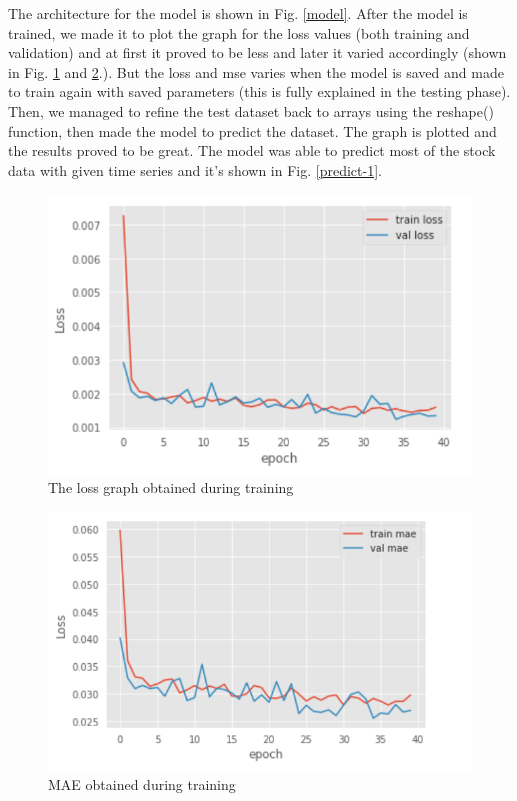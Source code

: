 \documentclass[conference]{IEEEtran}
\begin{document}
The architecture for the model is shown in Fig. \ref{model}. After the model is trained, we made it to plot the graph for the loss values (both training and validation) and at first it proved to be less and later it varied accordingly (shown in Fig. \ref{loss-1} and \ref{loss-2}.). But the loss and mse varies when the model is saved and made to train again with saved parameters (this is fully explained in the testing phase). Then, we managed to refine the test dataset back to arrays using the reshape() function, then made the model to predict the dataset. The graph is plotted and the results proved to be great. The model was able to predict most of the stock data with given time series and it's shown in Fig. \ref{predict-1}. 

\begin{figure}[htbp]
\centerline{\includegraphics[scale=0.7]{loss-1.png}}
\caption{The loss graph obtained during training}
\label{loss-1}
\end{figure}

\begin{figure}[htbp]
\centerline{\includegraphics[scale=0.7]{loss-2.png}}
\caption{MAE obtained during training}
\label{loss-2}
\end{figure}
\end{document}
